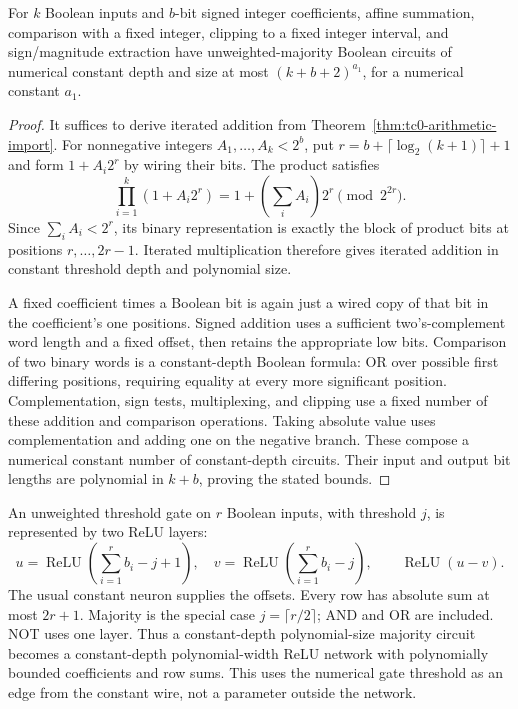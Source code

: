 \begin{lemma}
\label{lem:tc0-arithmetic}
For $k$ Boolean inputs and $b$-bit signed integer coefficients, affine summation, comparison with a fixed integer, clipping to a fixed integer interval, and sign/magnitude extraction have unweighted-majority Boolean circuits of numerical constant depth and size at most $(k+b+2)^{a_1}$, for a numerical constant $a_1$.
\end{lemma}
\begin{proof}
It suffices to derive iterated addition from Theorem~\ref{thm:tc0-arithmetic-import}. For nonnegative integers $A_1,\ldots,A_k<2^b$, put
$r=b+\lceil\log_2(k+1)\rceil+1$ and form $1+A_i2^r$ by wiring their bits. The product satisfies
\[
 \prod_{i=1}^k(1+A_i2^r)
 =1+\left(\sum_iA_i\right)2^r\pmod{2^{2r}}.
\]
Since $\sum_iA_i<2^r$, its binary representation is exactly the block of product bits at positions $r,\ldots,2r-1$. Iterated multiplication therefore gives iterated addition in constant threshold depth and polynomial size.

A fixed coefficient times a Boolean bit is again just a wired copy of that bit in the coefficient's one positions. Signed addition uses a sufficient two's-complement word length and a fixed offset, then retains the appropriate low bits. Comparison of two binary words is a constant-depth Boolean formula: OR over possible first differing positions, requiring equality at every more significant position. Complementation, sign tests, multiplexing, and clipping use a fixed number of these addition and comparison operations. Taking absolute value uses complementation and adding one on the negative branch. These compose a numerical constant number of constant-depth circuits. Their input and output bit lengths are polynomial in $k+b$, proving the stated bounds.
\end{proof}

An unweighted threshold gate on $r$ Boolean inputs, with threshold $j$, is represented by two ReLU layers:
\[
 u=\operatorname{ReLU}\left(\sum_{i=1}^r b_i-j+1\right),\quad
 v=\operatorname{ReLU}\left(\sum_{i=1}^r b_i-j\right),\qquad
 \operatorname{ReLU}(u-v).
\]
The usual constant neuron supplies the offsets. Every row has absolute sum at most $2r+1$. Majority is the special case $j=\lceil r/2\rceil$; AND and OR are included. NOT uses one layer. Thus a constant-depth polynomial-size majority circuit becomes a constant-depth polynomial-width ReLU network with polynomially bounded coefficients and row sums. This uses the numerical gate threshold as an edge from the constant wire, not a parameter outside the network.

